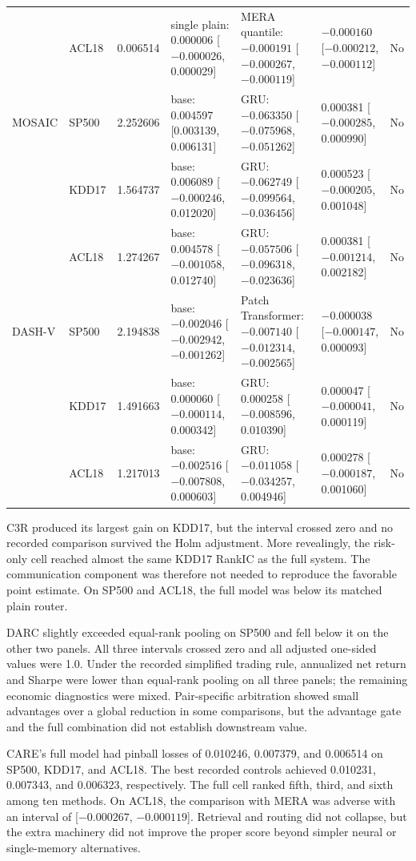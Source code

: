 \documentclass{crebss}
\begin{document}
\begin{longtable}{L{1.15cm}L{1.10cm}rL{3.25cm}L{3.35cm}L{3.05cm}c}
 & ACL18 & 0.006514 & single plain: 0.000006 [$-0.000026$, 0.000029] & MERA quantile: $-0.000191$ [$-0.000267$, $-0.000119$] & $-0.000160$ [$-0.000212$, $-0.000112$] & No \\
\addlinespace
MOSAIC & SP500 & 2.252606 & base: 0.004597 [0.003139, 0.006131] & GRU: $-0.063350$ [$-0.075968$, $-0.051262$] & 0.000381 [$-0.000285$, 0.000990] & No \\
 & KDD17 & 1.564737 & base: 0.006089 [$-0.000246$, 0.012020] & GRU: $-0.062749$ [$-0.099564$, $-0.036456$] & 0.000523 [$-0.000205$, 0.001048] & No \\
 & ACL18 & 1.274267 & base: 0.004578 [$-0.001058$, 0.012740] & GRU: $-0.057506$ [$-0.096318$, $-0.023636$] & 0.000381 [$-0.001214$, 0.002182] & No \\
\addlinespace
DASH-V & SP500 & 2.194838 & base: $-0.002046$ [$-0.002942$, $-0.001262$] & Patch Transformer: $-0.007140$ [$-0.012314$, $-0.002565$] & $-0.000038$ [$-0.000147$, 0.000093] & No \\
 & KDD17 & 1.491663 & base: 0.000060 [$-0.000114$, 0.000342] & GRU: 0.000258 [$-0.008596$, 0.010390] & 0.000047 [$-0.000041$, 0.000119] & No \\
 & ACL18 & 1.217013 & base: $-0.002516$ [$-0.007808$, 0.000603] & GRU: $-0.011058$ [$-0.034257$, 0.004946] & 0.000278 [$-0.000187$, 0.001060] & No \\
\bottomrule
\end{longtable}
\endgroup

C3R produced its largest gain on KDD17, but the interval crossed zero and no recorded comparison survived the Holm adjustment. More revealingly, the risk-only cell reached almost the same KDD17 RankIC as the full system. The communication component was therefore not needed to reproduce the favorable point estimate. On SP500 and ACL18, the full model was below its matched plain router.

DARC slightly exceeded equal-rank pooling on SP500 and fell below it on the other two panels. All three intervals crossed zero and all adjusted one-sided values were 1.0. Under the recorded simplified trading rule, annualized net return and Sharpe were lower than equal-rank pooling on all three panels; the remaining economic diagnostics were mixed. Pair-specific arbitration showed small advantages over a global reduction in some comparisons, but the advantage gate and the full combination did not establish downstream value.

CARE's full model had pinball losses of 0.010246, 0.007379, and 0.006514 on SP500, KDD17, and ACL18. The best recorded controls achieved 0.010231, 0.007343, and 0.006323, respectively. The full cell ranked fifth, third, and sixth among ten methods. On ACL18, the comparison with MERA was adverse with an interval of [$-0.000267$, $-0.000119$]. Retrieval and routing did not collapse, but the extra machinery did not improve the proper score beyond simpler neural or single-memory alternatives.
\end{document}
